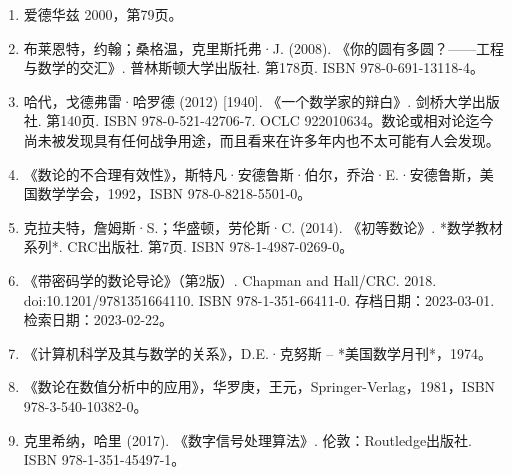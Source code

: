 \begin{enumerate}
\item 爱德华兹 2000，第79页。
\item 布莱恩特，约翰；桑格温，克里斯托弗·J. (2008). 《你的圆有多圆？——工程与数学的交汇》. 普林斯顿大学出版社. 第178页. ISBN 978-0-691-13118-4。
\item 哈代，戈德弗雷·哈罗德 (2012) [1940]. 《一个数学家的辩白》. 剑桥大学出版社. 第140页. ISBN 978-0-521-42706-7. OCLC 922010634。数论或相对论迄今尚未被发现具有任何战争用途，而且看来在许多年内也不太可能有人会发现。
\item 《数论的不合理有效性》，斯特凡·安德鲁斯·伯尔，乔治·E.·安德鲁斯，美国数学学会，1992，ISBN 978-0-8218-5501-0。
\item 克拉夫特，詹姆斯·S.；华盛顿，劳伦斯·C. (2014). 《初等数论》. *数学教材系列*. CRC出版社. 第7页. ISBN 978-1-4987-0269-0。
\item 《带密码学的数论导论》（第2版）. Chapman and Hall/CRC. 2018. doi:10.1201/9781351664110. ISBN 978-1-351-66411-0. 存档日期：2023-03-01. 检索日期：2023-02-22。
\item 《计算机科学及其与数学的关系》，D.E.·克努斯 – *美国数学月刊*，1974。
\item 《数论在数值分析中的应用》，华罗庚，王元，Springer-Verlag，1981，ISBN 978-3-540-10382-0。
\item 克里希纳，哈里 (2017). 《数字信号处理算法》. 伦敦：Routledge出版社. ISBN 978-1-351-45497-1。

\end{enumerate}